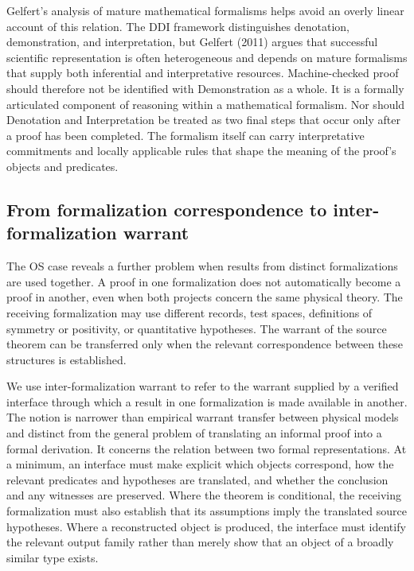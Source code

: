 \documentclass[pdflatex,sn-apa]{sn-jnl}
\begin{document}
Gelfert's analysis of mature mathematical formalisms helps avoid an overly linear account of this relation. The DDI framework distinguishes denotation, demonstration, and interpretation, but Gelfert (2011) argues that successful scientific representation is often heterogeneous and depends on mature formalisms that supply both inferential and interpretative resources. Machine-checked proof should therefore not be identified with Demonstration as a whole. It is a formally articulated component of reasoning within a mathematical formalism. Nor should Denotation and Interpretation be treated as two final steps that occur only after a proof has been completed. The formalism itself can carry interpretative commitments and locally applicable rules that shape the meaning of the proof's objects and predicates.

\subsection{From formalization correspondence to inter-formalization warrant}

The OS case reveals a further problem when results from distinct formalizations are used together. A proof in one formalization does not automatically become a proof in another, even when both projects concern the same physical theory. The receiving formalization may use different records, test spaces, definitions of symmetry or positivity, or quantitative hypotheses. The warrant of the source theorem can be transferred only when the relevant correspondence between these structures is established.

We use inter-formalization warrant to refer to the warrant supplied by a verified interface through which a result in one formalization is made available in another. The notion is narrower than empirical warrant transfer between physical models and distinct from the general problem of translating an informal proof into a formal derivation. It concerns the relation between two formal representations. At a minimum, an interface must make explicit which objects correspond, how the relevant predicates and hypotheses are translated, and whether the conclusion and any witnesses are preserved. Where the theorem is conditional, the receiving formalization must also establish that its assumptions imply the translated source hypotheses. Where a reconstructed object is produced, the interface must identify the relevant output family rather than merely show that an object of a broadly similar type exists.
\end{document}
